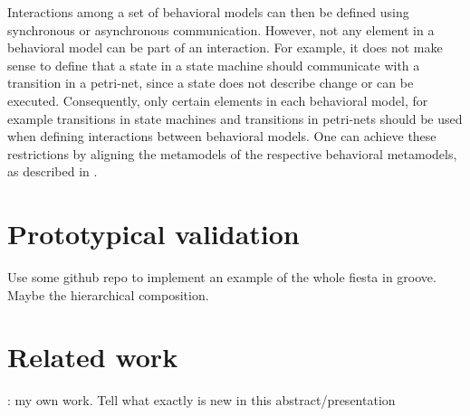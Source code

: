 \documentclass[a4paper]{easychair}
\begin{document}
Interactions among a set of behavioral models can then be defined using synchronous or asynchronous communication.
However, not any element in a behavioral model can be part of an interaction.
For example, it does not make sense to define that a state in a state machine should communicate with a transition in a petri-net, since a state does not describe change or can be executed.
Consequently, only certain elements in each behavioral model, for example transitions in state machines and transitions in petri-nets should be used when defining interactions between behavioral models.
One can achieve these restrictions by aligning the metamodels of the respective behavioral metamodels, as described in \cite{krauterBehavioralConsistencyHeterogeneous2021}.










\section{Prototypical validation}
Use some github repo to implement an example of the whole fiesta in groove. Maybe the hierarchical composition.

\section{Related work}
\cite{krauterBehavioralConsistencyHeterogeneous2021}: my own work.
Tell what exactly is new in this abstract/presentation
\end{document}
